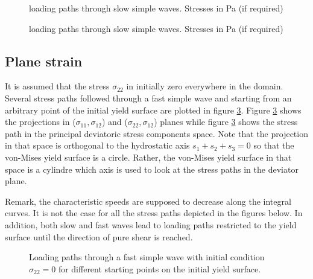 \begin{figure}[h!]
  \centering
  \caption{loading paths through slow simple waves. Stresses in Pa (if required)}
  \label{fig:slow_path_plane_strains}
\end{figure}


\begin{figure}[h!]
  \centering
  \caption{loading paths through slow simple waves. Stresses in Pa (if required)}
  \label{fig:slow_path_plane_strains}
\end{figure}



\subsection{Plane strain}
It is assumed that the stress $\sigma_{22}$ in initially zero everywhere in the domain. Several stress paths followed through a fast simple wave and starting from an arbitrary point of the initial yield surface are plotted in figure \ref{fig:fast_path_plane_strains}. Figure \ref{fig:fast_path_plane_strains} shows the projections in ($\sigma_{11},\sigma_{12}$) and ($\sigma_{22},\sigma_{12}$) planes while figure \ref{fig:fast_path_plane_strains} shows the stress path in the principal deviatoric stress components space. Note that the projection in that space is orthogonal to the hydrostatic axis $s_1+s_2+s_3=0$ so that the von-Mises yield surface is a circle. Rather, the von-Mises yield surface in that space is a cylindre which axis is used to look at the stress paths in the deviator plane.

Remark, the characteristic speeds are supposed to decrease along the integral curves. It is not the case for all the stress paths depicted in the figures below. In addition, both slow and fast waves lead to loading paths restricted to the yield surface until the direction of pure shear is reached.
\begin{figure}[h!]
  \centering
  \caption{Loading paths through a fast simple wave with initial condition $\sigma_{22}=0$ for different starting points on the initial yield surface.}
  \label{fig:fast_path_plane_strains}
\end{figure}


